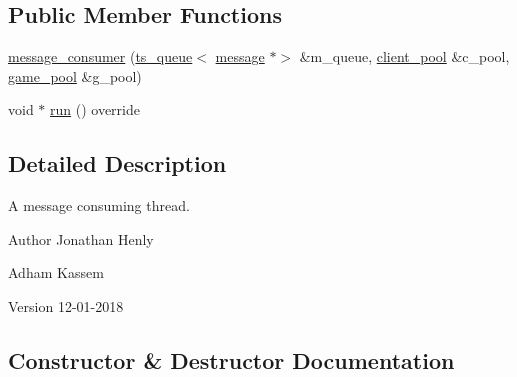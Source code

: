 \subsection*{Public Member Functions}
\begin{DoxyCompactItemize}
\item 
\hyperlink{classbattleship_1_1game__server_1_1message__consumer_a266c52a9e282be54a95c1338432ead58}{message\+\_\+consumer} (\hyperlink{classbattleship_1_1ts__queue}{ts\+\_\+queue}$<$ \hyperlink{classbattleship_1_1network__message_1_1message}{message} $\ast$$>$ \&m\+\_\+queue, \hyperlink{classbattleship_1_1game__server_1_1client__pool}{client\+\_\+pool} \&c\+\_\+pool, \hyperlink{classbattleship_1_1game__server_1_1game__pool}{game\+\_\+pool} \&g\+\_\+pool)
\item 
void $\ast$ \hyperlink{classbattleship_1_1game__server_1_1message__consumer_ad4c9cb302cbaaa1e6c336499a218e105}{run} () override
\end{DoxyCompactItemize}


\subsection{Detailed Description}
A message consuming thread. 

\begin{DoxyAuthor}{Author}
Jonathan Henly 

Adham Kassem 
\end{DoxyAuthor}
\begin{DoxyVersion}{Version}
12-\/01-\/2018 
\end{DoxyVersion}


\subsection{Constructor \& Destructor Documentation}
\mbox{\label{classbattleship_1_1game__server_1_1message__consumer_a266c52a9e282be54a95c1338432ead58}} 
